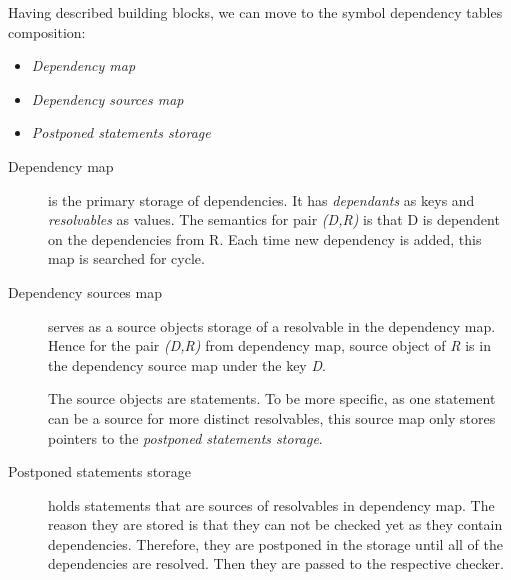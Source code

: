 Having described building blocks, we can move to the symbol dependency tables composition:
\begin{itemize}
	\item \emph{Dependency map}
	\item \emph{Dependency sources map}
	\item \emph{Postponed statements storage}
\end{itemize}

\begin{description}
	\item[Dependency map] is the primary storage of dependencies. It has \emph{dependants} as keys and \emph{resolvables} as values. The semantics for pair \emph{(D,R)} is that D is dependent on the dependencies from R. Each time new dependency is added, this map is searched for cycle.
	
	\item[Dependency sources map] serves as a source objects storage of a resolvable in the dependency map. Hence for the pair \emph{(D,R)} from dependency map, source object of \emph{R} is in the dependency source map under the key \emph{D}. 
	
	The source objects are statements. To be more specific, as one statement can be a source for more distinct resolvables, this source map only stores pointers to the \emph{postponed statements storage}.
	
	\item[Postponed statements storage] holds statements that are sources of resolvables in dependency map. The reason they are stored is that they can not be checked yet as they contain dependencies. Therefore, they are postponed in the storage until all of the dependencies are resolved. Then they are passed to the respective checker.
\end{description}


